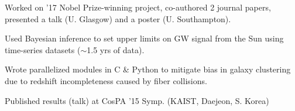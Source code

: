 \documentclass[]{deedy-resume-openfont}
\begin{document}
\begin{minipage}[t]{0.66\textwidth}
 \hfill {}

\begin{tightemize}
\item Worked on '17 Nobel Prize-winning project, co-authored 2 journal papers, presented a talk (U. Glasgow) and a poster (U. Southampton).\item Used Bayesian inference to set upper limits on GW signal from the Sun using time-series datasets ($\sim$1.5 yrs of data). \end{tightemize}
\sectionsep

\sectionsep
\sectionsep

 \hfill  {}


\begin{tightemize}
\item Wrote parallelized modules in C \& Python to mitigate bias in galaxy clustering due to redshift incompleteness caused by fiber collisions. \item Published results (talk) at CosPA '15 Symp. (KAIST, Daejeon, S. Korea) \end{tightemize}
\sectionsep
\end{minipage} 


\end{document}
